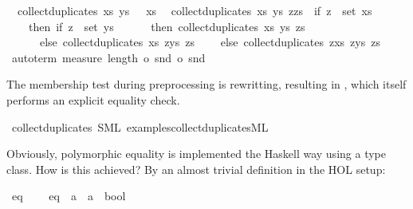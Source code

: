 \begin{isabellebody}
\ \ {\isachardoublequoteopen}collect{\isacharunderscore}duplicates\ xs\ ys\ {\isacharbrackleft}{\isacharbrackright}\ {\isacharequal}\ xs{\isachardoublequoteclose}\isanewline
\ \ {\isachardoublequoteopen}collect{\isacharunderscore}duplicates\ xs\ ys\ {\isacharparenleft}z{\isacharhash}zs{\isacharparenright}\ {\isacharequal}\ {\isacharparenleft}if\ z\ {\isasymin}\ set\ xs\isanewline
\ \ \ \ then\ if\ z\ {\isasymin}\ set\ ys\isanewline
\ \ \ \ \ \ then\ collect{\isacharunderscore}duplicates\ xs\ ys\ zs\isanewline
\ \ \ \ \ \ else\ collect{\isacharunderscore}duplicates\ xs\ {\isacharparenleft}z{\isacharhash}ys{\isacharparenright}\ zs\isanewline
\ \ \ \ else\ collect{\isacharunderscore}duplicates\ {\isacharparenleft}z{\isacharhash}xs{\isacharparenright}\ {\isacharparenleft}z{\isacharhash}ys{\isacharparenright}\ zs{\isacharparenright}{\isachardoublequoteclose}\isanewline
{}\isamarkupfalse%
%
\isadelimproof
\ %
\endisadelimproof
%
\isatagproof
{}\isamarkupfalse%
\ {\isacharparenleft}auto{\isacharunderscore}term\ {\isachardoublequoteopen}measure\ {\isacharparenleft}length\ o\ snd\ o\ snd{\isacharparenright}{\isachardoublequoteclose}{\isacharparenright}%
\endisatagproof
{\isafoldproof}%
%
\isadelimproof
%
\endisadelimproof
%
\begin{isamarkuptext}%
The membership test during preprocessing is rewritting,
  resulting in , which itself
  performs an explicit equality check.%
\end{isamarkuptext}%
\isamarkuptrue%
\isamarkupfalse%
\ collect{\isacharunderscore}duplicates\ {\isacharparenleft}SML\ {\isachardoublequoteopen}examples{\isacharslash}collect{\isacharunderscore}duplicates{\isachardot}ML{\isachardoublequoteclose}{\isacharparenright}%
\begin{isamarkuptext}%
%
\end{isamarkuptext}%
\isamarkuptrue%
%
\begin{isamarkuptext}%
Obviously, polymorphic equality is implemented the Haskell
  way using a type class.  How is this achieved?  By an
  almost trivial definition in the HOL setup:%
\end{isamarkuptext}%
\isamarkuptrue%
%
\isadelimML
%
\endisadelimML
%
\isatagML
%
\endisatagML
{\isafoldML}%
%
\isadelimML
\isanewline
%
\endisadelimML
{}\isamarkupfalse%
\ eq\ {\isacharequal}\isanewline
\ \ \ eq\ {\isacharcolon}{\isacharcolon}\ {\isachardoublequoteopen}{\isacharprime}a\ {\isasymRightarrow}\ {\isacharprime}a\ {\isasymRightarrow}\ bool{\isachardoublequoteclose}\isanewline

\end{isabellebody}
